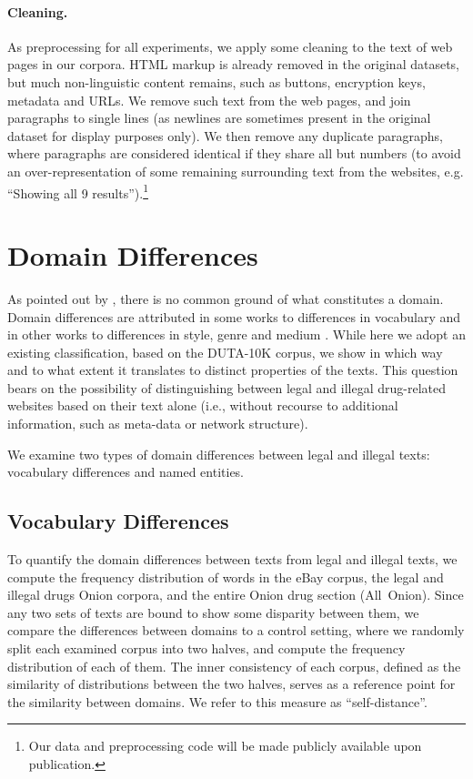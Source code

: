 \documentclass[11pt,a4paper,table]{article}
\begin{document}
\paragraph{Cleaning.} 
As preprocessing for all experiments, we apply some cleaning to the text
of web pages in our corpora.
HTML markup is already removed in the original datasets,
but much non-linguistic content remains, such as
buttons, encryption keys, metadata and URLs.
We remove such text from the web pages, and join paragraphs 
to single lines (as newlines are sometimes present in the original dataset for display purposes only).
We then remove any duplicate paragraphs, where paragraphs are considered
identical if they share all but numbers (to avoid an over-representation of some remaining surrounding text from the websites, e.g. ``Showing all 9 results'').\footnote{Our data and preprocessing code  will be made publicly available upon publication.}

\section{Domain Differences}\label{sec:domain}

As pointed out by \citet{Plank11}, there is no common ground of what constitutes a domain. Domain differences are attributed in some works to differences in vocabulary \citep{Blitzer06} and in other works to differences in style, genre and medium \citep{McClosky2010}. While here we adopt an existing classification, based on the DUTA-10K corpus, 
we show in which way and to what extent it translates to distinct properties of the texts. 
This question bears on the possibility of distinguishing between legal and illegal drug-related websites based on their text alone (i.e., without recourse to additional information, such as meta-data or network structure).
    
We examine two types of domain differences between legal and illegal texts: vocabulary differences and named entities. 

\subsection{Vocabulary Differences}

    To quantify the domain differences between texts from legal and illegal texts,
    we compute the frequency distribution of words in the eBay corpus, the legal and illegal drugs Onion corpora, and the entire Onion drug section (All~Onion). 
    Since any two sets of texts are bound to show some disparity between them, we compare the differences between domains to a control setting, where we randomly split each examined corpus into two halves, and compute the frequency distribution of each of them.
    The inner consistency of each corpus, defined as the similarity of distributions between the two halves, serves as a reference point for the similarity between domains.
    We refer to this measure as ``self-distance''.
    
\end{document}
